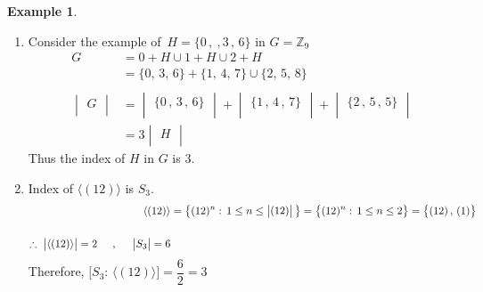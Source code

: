 \documentclass[11pt,a4paper]{article}
\theoremstyle{definition}
\newtheorem{exa}[thm]{Example}
\begin{document}
\begin{exa}
\begin{enumerate}
\item Consider the example of $\, H = \{0\, , \ , 3\, , \, 6\}$ in $G = \mathbb{Z}_9$
\begin{align*}
G & = 0 + H\cup 1 + H\cup 2 + H\\
& = \{0, \, 3, \, 6\} + \{1, \, 4, \, 7\} \cup \{2, \, 5,\, 8\}\\\\
\begin{vmatrix}
G\\
\end{vmatrix} & = \begin{vmatrix}
\{0\, , \, 3\, , \, 6\}\\
\end{vmatrix} + \begin{vmatrix}
\{1\, , \, 4\, , \, 7\}\\
\end{vmatrix} + \begin{vmatrix}
\{2\, , \, 5\, , \, 5\}\\
\end{vmatrix}\\
& = 3\begin{vmatrix}
H\\
\end{vmatrix}
\end{align*}
Thus the index of $H$ in $G$ is 3.\\



\item Index of $\langle(12)\rangle$ is $S_3$.
\begin{align*}
\langle(12)\rangle & = \big\{(12)^n:\, 1\leq n\leq \begin{vmatrix}
(12)\\
\end{vmatrix}\big\} = \big\{(12)^n:\, 1\leq n\leq 2\big\} = \big\{(12)\, , \, (1)\big\}\\\\
\therefore\,\, \begin{vmatrix}
\langle(12)\rangle\\
\end{vmatrix} = 2\hspace{0.5cm},\hspace{0.5cm} \begin{vmatrix}
S_3\\
\end{vmatrix} = 6
\end{align*}
Therefore, $\big[S_3:\, \langle(12)\rangle\big] = \dfrac{6}{2} = 3$\\





\end{enumerate}
\end{exa}
\end{document}
